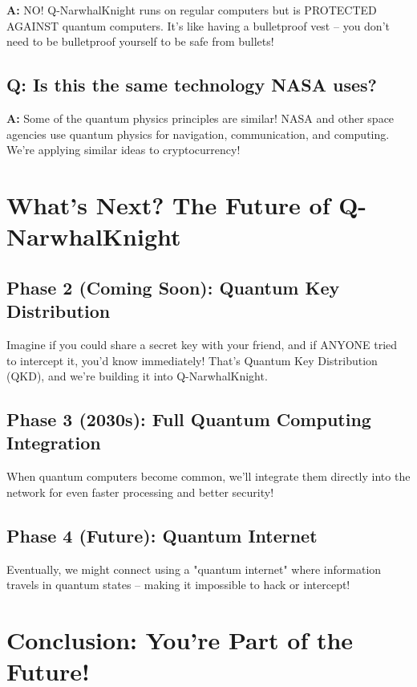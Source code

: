 \documentclass[11pt,a4paper]{article}
\begin{document}
\textbf{A:} NO! Q-NarwhalKnight runs on regular computers but is PROTECTED AGAINST quantum computers. It's like having a bulletproof vest -- you don't need to be bulletproof yourself to be safe from bullets!

\subsection{Q: Is this the same technology NASA uses?}

\textbf{A:} Some of the quantum physics principles are similar! NASA and other space agencies use quantum physics for navigation, communication, and computing. We're applying similar ideas to cryptocurrency!

\section{What's Next? The Future of Q-NarwhalKnight}

\subsection{Phase 2 (Coming Soon): Quantum Key Distribution}

Imagine if you could share a secret key with your friend, and if ANYONE tried to intercept it, you'd know immediately! That's Quantum Key Distribution (QKD), and we're building it into Q-NarwhalKnight.

\subsection{Phase 3 (2030s): Full Quantum Computing Integration}

When quantum computers become common, we'll integrate them directly into the network for even faster processing and better security!

\subsection{Phase 4 (Future): Quantum Internet}

Eventually, we might connect using a "quantum internet" where information travels in quantum states -- making it impossible to hack or intercept!

\section{Conclusion: You're Part of the Future!}
\end{document}
